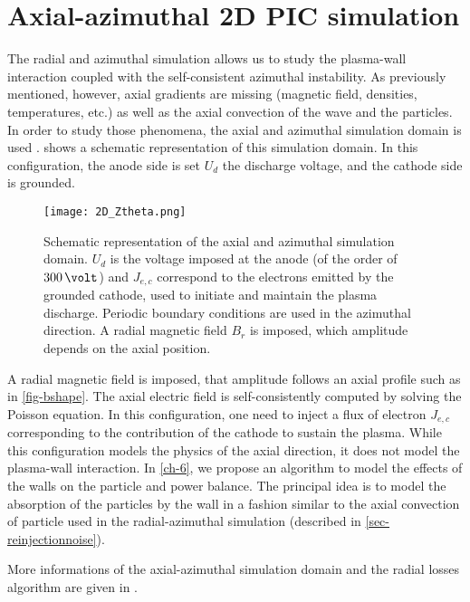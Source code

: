 
\section{Axial-azimuthal \acs{2D} \acs{PIC} simulation}
  \label{sec-axial-azimuthal}
  
  The radial and azimuthal simulation allows us to study the plasma-wall interaction coupled with the self-consistent azimuthal instability.
  As previously mentioned, however, axial gradients are missing (magnetic field, densities, temperatures, etc.) as well as the axial convection of the wave and the particles.
  In order to study those phenomena, the axial and azimuthal simulation domain is used \citep{adam2004,coche2014,lafleur2018,boeuf2018}.
   shows a schematic representation of this simulation domain.
  In this configuration, the anode side is set $U_d$ the discharge voltage, and the cathode side is grounded.
  
  
  
  \begin{figure}[hbt]
    \centering
    \texttt{[image: 2D\_Ztheta.png]}
    \caption{Schematic representation of the axial and azimuthal simulation domain. $U_d$ is the voltage imposed at the anode (of the order of $300\,\volt$) and $J_{e,c}$ correspond to the electrons emitted by the grounded cathode, used to initiate and maintain the plasma discharge. Periodic boundary conditions are used in the azimuthal direction. A radial magnetic field $B_r$ is imposed, which amplitude depends on the axial position. }
    \label{fig-2Dz}
  \end{figure}
  A radial magnetic field is imposed, that amplitude follows an axial profile such as in \cref{fig-bshape}.
  The axial electric field is self-consistently computed by solving the Poisson equation.
  In this configuration, one need to inject a flux of electron $J_{e,c}$ corresponding to the contribution of the cathode to sustain the plasma.
  While this configuration models the physics of the axial direction, it does not model the plasma-wall interaction.
  In \cref{ch-6}, we propose an algorithm to model the effects of the walls on the particle and power balance.
  The principal idea is to model the absorption  of the particles by the wall in a fashion similar to the axial convection of particle used in the radial-azimuthal simulation (described in \cref{sec-reinjectionnoise}).
  
  More informations of the axial-azimuthal simulation domain and the radial losses algorithm are given in .
  
  